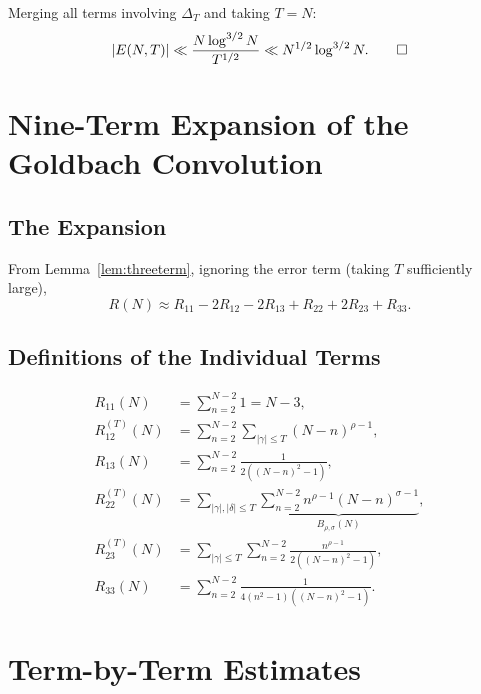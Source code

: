 \documentclass[11pt,a4paper]{article}
\theoremstyle{remark}
\begin{document}
Merging all terms involving $\Delta_T$ and taking $T = N$:
\[
|E(N,T)| \ll \frac{N\log^{3/2} N}{T^{1/2}} \ll N^{1/2}\log^{3/2} N. \qed
\]

\section{Nine-Term Expansion of the Goldbach Convolution}

\subsection{The Expansion}

From Lemma~\ref{lem:threeterm}, ignoring the error term (taking $T$ sufficiently large),
\begin{equation}\label{eq:sixterm}
R(N) \approx R_{11} - 2R_{12} - 2R_{13} + R_{22} + 2R_{23} + R_{33}.
\end{equation}

\subsection{Definitions of the Individual Terms}

\begin{align}
R_{11}(N) &= \sum_{n=2}^{N-2} 1 = N - 3, \label{eq:R11}\\
R_{12}^{(T)}(N) &= \sum_{n=2}^{N-2} \sum_{|\gamma| \leq T} (N-n)^{\rho-1}, \label{eq:R12}\\
R_{13}(N) &= \sum_{n=2}^{N-2} \frac{1}{2((N-n)^2-1)}, \label{eq:R13}\\
R_{22}^{(T)}(N) &= \sum_{|\gamma|,|\delta| \leq T} \underbrace{\sum_{n=2}^{N-2} n^{\rho-1}(N-n)^{\sigma-1}}_{B_{\rho,\sigma}(N)}, \label{eq:R22}\\
R_{23}^{(T)}(N) &= \sum_{|\gamma| \leq T} \sum_{n=2}^{N-2} \frac{n^{\rho-1}}{2((N-n)^2-1)}, \label{eq:R23}\\
R_{33}(N) &= \sum_{n=2}^{N-2} \frac{1}{4(n^2-1)((N-n)^2-1)}. \label{eq:R33}
\end{align}

\section{Term-by-Term Estimates}
\end{document}
